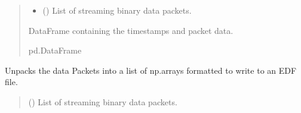 \documentclass[letterpaper,10pt,english]{sphinxmanual}
\begin{document}
\begin{fulllineitems}
\begin{fulllineitems}
\begin{quote}
\begin{description}
\begin{itemize}
\item {} 
\sphinxAtStartPar
{} (\sphinxstyleliteralemphasis{\sphinxupquote{{[}}}{\hyperref[\detokenize{Morelia.Packets:Morelia.Packets.Packet.Packet}]{\sphinxcrossref{\sphinxstyleliteralemphasis{\sphinxupquote{Packet}}}}}\sphinxstyleliteralemphasis{\sphinxupquote{ | }}\sphinxstyleliteralemphasis{\sphinxupquote{{]}}}) \textendash{} List of streaming binary data packets.

\end{itemize}

\sphinxAtStartPar
DataFrame containing the timestamps and packet data.

\sphinxAtStartPar
pd.DataFrame

\end{description}\end{quote}

\end{fulllineitems}


\begin{fulllineitems}
\label{\detokenize{Morelia.Stream.PodHandler:Morelia.Stream.PodHandler.Handle8274D.Drain8274D.DropToListOfArrays}}
\pysigstartsignatures
{}
\pysigstopsignatures
\sphinxAtStartPar
Unpacks the data Packets into a list of np.arrays formatted to write to an EDF file.
\begin{quote}\begin{description}
\sphinxAtStartPar
{} (\sphinxstyleliteralemphasis{\sphinxupquote{{[}}}{\hyperref[\detokenize{Morelia.Packets:Morelia.Packets.Packet.Packet}]{\sphinxcrossref{\sphinxstyleliteralemphasis{\sphinxupquote{Packet}}}}}\sphinxstyleliteralemphasis{\sphinxupquote{ | }}\sphinxstyleliteralemphasis{\sphinxupquote{{]}}}) \textendash{} List of streaming binary data packets.


\end{description}
\end{quote}
\end{fulllineitems}
\end{fulllineitems}
\end{document}
